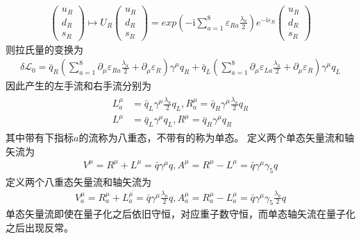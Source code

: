 \documentclass[aps,tightenlines,16pt]{ctexart}
\numberwithin{equation}{section}
\newcommand{\mL}{\mathcal{L}}
\begin{document}
\begin{align}
   \begin{pmatrix}
      u_R\\
      d_R\\
      s_R
   \end{pmatrix}
   \mapsto U_R
   \begin{pmatrix}
      u_R\\
      d_R\\
      s_R
   \end{pmatrix}
   =
   exp\left(-\mbox{i}\sum_{a=1}^{8}\varepsilon_{Ra}\frac{\lambda_a}{2}\right)
   e^{-\mbox{i}\varepsilon_R}
   \begin{pmatrix}
      u_R\\
      d_R\\
      s_R
   \end{pmatrix}
\end{align}
则拉氏量的变换为
\begin{align}
   \delta \mL_0 = \bar{q}_R \left(\sum_{a=1}^8\partial_{\mu}\varepsilon_{Ra}\frac{\lambda_a}{2}+\partial_{\mu}\varepsilon_R\right)\gamma^{\mu} q_R + \bar{q}_L \left(\sum_{a=1}^8\partial_{\mu}\varepsilon_{La}\frac{\lambda_a}{2}+\partial_{\mu}\varepsilon_R\right)\gamma^{\mu} q_L
\end{align}
因此产生的左手流和右手流分别为
\begin{align}
   \begin{aligned}
      L^{\mu}_a &= \bar{q}_L\gamma^{\mu}\frac{\lambda_a}{2}q_L, R^{\mu}_a = \bar{q}_R\gamma^{\mu}\frac{\lambda_a}{2}q_R \\
      L^{\mu} &= \bar{q}_L\gamma^{\mu}q_L, R^{\mu} = \bar{q}_R\gamma^{\mu}q_R
   \end{aligned}
\end{align} 
其中带有下指标$a$的流称为八重态，不带有的称为单态。
定义两个单态矢量流和轴矢流为
\begin{align}
   V^{\mu} = R^{\mu} + L^{\mu} = \bar{q}\gamma^{\mu}q, 
   A^{\mu} = R^{\mu} - L^{\mu} = \bar{q}\gamma^{\mu}\gamma_5  q 
\end{align}
定义两个八重态矢量流和轴矢流为
\begin{align}
   V_a^{\mu} = R_a^{\mu} + L_a^{\mu} = \bar{q}\gamma^{\mu}\frac{\lambda_a}{2} q, 
   A_a^{\mu} = R_a^{\mu} - L_a^{\mu} = \bar{q}\gamma^{\mu}\gamma_5 \frac{\lambda_a}{2} q 
\end{align}
单态矢量流即使在量子化之后依旧守恒，对应重子数守恒，而单态轴矢流在量子化之后出现反常。
\end{document}
